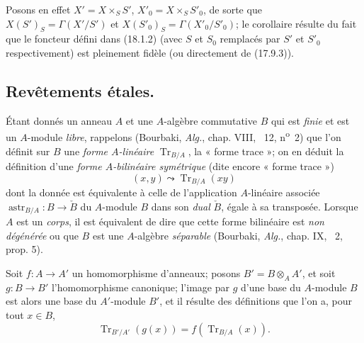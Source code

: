 Posons en effet $X'=X\times_S S'$, $X'_0=X\times_S S'_0$, de sorte que $X(S')_S=\Gamma(X'/S')$ et $X(S'_0)_S=\Gamma(X'_0/S'_0)$; le corollaire résulte du fait que le foncteur défini dans (18.1.2) (avec $S$ et $S_0$ remplacés par $S'$ et $S'_0$ respectivement) est pleinement fidèle (ou directement de (17.9.3)).


\subsection{Revêtements étales.}

\begin{env}[18.2.1]
Étant donnés un anneau $A$ et une $A$-algèbre commutative $B$ qui est \emph{finie} et est un $A$-module \emph{libre}, rappelons (Bourbaki, \emph{Alg.}, chap. VIII, \textsection~12, n\textsuperscript{o}~2) que l'on définit sur $B$ une \emph{forme $A$-linéaire} $\operatorname{Tr}_{B/A}$, la « forme trace »; on en déduit la définition d'une \emph{forme $A$-bilinéaire symétrique} (dite encore « forme trace »)
\begin{equation}
  (x,y)\leadsto\operatorname{Tr}_{B/A}(xy)
  \tag{18.2.1.1}\label{IV.18.2.1.1}
\end{equation}
dont la donnée est équivalente à celle de l'application $A$-linéaire associée $\operatorname{astr}_{B/A}:B\to\check B$ du $A$-module $B$ dans son \emph{dual} $\check B$, égale à sa transposée. Lorsque $A$ est un \emph{corps}, il est équivalent de dire que cette forme bilinéaire est \emph{non dégénérée} ou que $B$ est une $A$-algèbre \emph{séparable} (Bourbaki, \emph{Alg.}, chap. IX, \textsection~2, prop. 5).

Soit $f:A\to A'$ un homomorphisme d'anneaux; posons $B'=B\otimes_A A'$, et soit $g:B\to B'$ l'homomorphisme canonique; l'image par $g$ d'une base du $A$-module $B$ est alors une base du $A'$-module $B'$, et il résulte des définitions que l'on a, pour tout $x\in B$,
\begin{equation}
  \operatorname{Tr}_{B'/A'}(g(x))=f(\operatorname{Tr}_{B/A}(x)).
  \tag{18.2.1.2}\label{IV.18.2.1.2}
\end{equation}
\end{env}

